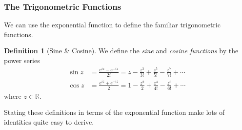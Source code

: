 \documentclass[11pt, a4paper]{article}
\newtheorem{proposition}[theorem]{Proposition}
\theoremstyle{definition}
\newtheorem{definition}[theorem]{Definition}
\newcommand{\vocab}[1]{\emph{#1}} %
\newcommand{\R}{\mathbb{R}}
\begin{document}


\subsubsection{The Trigonometric Functions}

We can use the exponential function to define the familiar trigonometric functions.

\begin{definition}[Sine \& Cosine]
	We define the \vocab{sine} and \vocab{cosine functions} by the power series
	\begin{align*}
		\sin z &= \frac{e^{iz} - e^{-iz}}{2i} = z - \frac{z^3}{3!} + \frac{z^5}{5!} - \frac{z^7}{7!} + \cdots \\
		\cos z &= \frac{e^{iz} + e^{-iz}}{2} = 1 - \frac{z^2}{2} + \frac{z^4}{4!} - \frac{z^6}{6!} + \cdots
	\end{align*}
	where $z \in \R$.
\end{definition}

Stating these definitions in terms of the exponential function make lots of identities quite easy to derive.
\end{document}
